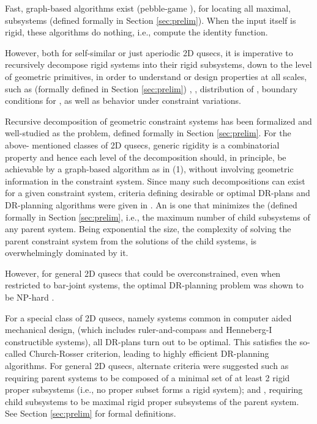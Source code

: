 \medskip\noindent
{}
Fast, graph-based algorithms exist (pebble-game \cite{Jacobs:1997:PG,lee2005finding}), for locating all maximal,
 subsystems (defined formally in Section
\ref{sec:prelim}). When the input itself is rigid, these
algorithms do nothing, i.e., compute the identity function.

However, both for self-similar or just aperiodic 2D qusecs, it is
imperative to recursively decompose rigid systems into their rigid
subsystems, down to the level of geometric primitives, in order to
understand or design properties at all scales, such as (formally
defined in Section \ref{sec:prelim}) , ,
distribution of , boundary conditions for
, as well as behavior under constraint variations.

\medskip\noindent
{}
Recursive decomposition of geometric constraint systems has been
formalized \cite{hoffman2001decompositionI,hoffman2001decompositionII} and well-studied \cite{jermann2006decomposition,sitharam2005combinatorial} as the 
 problem, defined formally in
Section \ref{sec:prelim}. For the above-
mentioned classes of 2D qusecs, generic rigidity is a combinatorial
property and hence each level of the decomposition should, in
principle, be achievable by a graph-based algorithm as in (1), without
involving geometric information in the constraint system. Since many
such decompositions can exist for a given constraint system, criteria
defining desirable or optimal DR-plans and DR-planning algorithms were
given in \cite{hoffman2001decompositionI}. An  is one that minimizes
the  (defined formally in Section \ref{sec:prelim}, i.e.,
the maximum number of child subsystems of any parent system.
Being exponential the size, the complexity of solving the parent
constraint system from the solutions of the child systems, is overwhelmingly
dominated by it.

However, for general 2D qusecs that could be overconstrained, even
when restricted to bar-joint systems, the optimal DR-planning problem
was shown to be NP-hard \cite{lomonosov2004graph}.

\medskip\noindent
{}
For a special class of 2D qusecs, namely 
systems  \cite{fudos1997graph,owen1991algebraic,joan-arinyo2004revisiting}  common in computer aided mechanical design, (which
includes ruler-and-compass and Henneberg-I constructible systems), all
DR-plans turn out to be optimal. This satisfies the so-called \dfn
{Church-Rosser} criterion, leading to highly efficient DR-planning
algorithms. For general 2D qusecs, alternate criteria were suggested
such as  requiring parent systems to be
composed of a minimal set of at least 2 rigid proper subsystems (i.e.,
no proper subset forms a rigid system); and ,
requiring child subsystems to be maximal rigid proper subsystems of
the parent system. See Section \ref{sec:prelim} for formal definitions.

